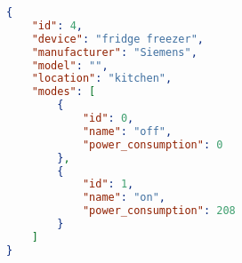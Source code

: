 \begin{lstlisting}[language=json,caption={JSON file describing the fridge.},label=fridge_json,float,floatplacement=H]
{
    "id": 4,
    "device": "fridge freezer",
    "manufacturer": "Siemens",
    "model": "",
    "location": "kitchen",
    "modes": [
        {
            "id": 0,
            "name": "off",
            "power_consumption": 0
        },
        {
            "id": 1,
            "name": "on",
            "power_consumption": 208
        }
    ]
}
\end{lstlisting}